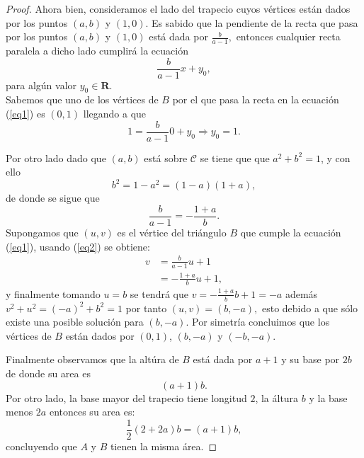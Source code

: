 \documentclass[10pt]{article}
\begin{document}
\begin{itemize}
\begin{proof}
Ahora bien, consideramos el lado del trapecio cuyos vértices están dados por los puntos $(a,b)$ y $(1,0)$. Es sabido que la pendiente de la recta que pasa por los puntos $(a,b)$ y $(1,0)$ está dada por    $ \frac{b}{a-1}, $ 
entonces cualquier recta paralela a dicho lado cumplirá la ecuación 
\begin{equation}\label{eq1}
 \frac{b}{a-1}x+y_0,
\end{equation}
para algún valor $y_0 \in \mathbf{R}$. \\
Sabemos que uno de los vértices de $B$ por el que pasa la recta en la ecuación (\ref{eq1}) es $(0,1)$ llegando a que 
$$1=\frac{b}{a-1}0+y_0 \Rightarrow y_0=1.$$

Por otro lado dado que $(a,b)$ está sobre $\mathcal{C}$ se tiene que que $a^2+ b^2=1$, y con ello 
$$ b^2 = 1-a^2=(1-a)(1+a),$$ 
de donde se sigue que
\begin{equation}\label{eq2}
 \frac{b}{a-1}= -\frac{1+a}{b}.
\end{equation}
Supongamos que $(u,v)$ es el vértice del triángulo $B$ que cumple la ecuación (\ref{eq1}), usando (\ref{eq2}) se obtiene:
\begin{align*}
v&=  \frac{b}{a-1}u+1\\
&= -\frac{1+a}{b} u + 1,
\end{align*}
y finalmente tomando $u=b$ se tendrá que $v=-\frac{1+a}{b}b+1=-a$ además $v^2+u^2=(-a)^2+b^2=1$ por tanto $(u,v)=(b,-a),$ esto debido a que sólo existe una posible solución para $(b,-a).$ Por simetría concluimos que los vértices de $B$ están dados por $(0,1)$, $(b,-a)$ y $(-b,-a).$ 

Finalmente observamos que la altúra de $B$ está dada por $a+1$ y su base por $2b$ de donde su area es $$(a+1)b.$$
Por otro lado, la base mayor del trapecio tiene longitud $2$, la áltura $b$ y la base menos $2a$ entonces su area es:
$$\frac{1}{2}(2+2a)b=(a+1)b,$$
concluyendo que $A$ y $B$ tienen la misma área.
\end{proof} 




\end{itemize}
\end{document}
